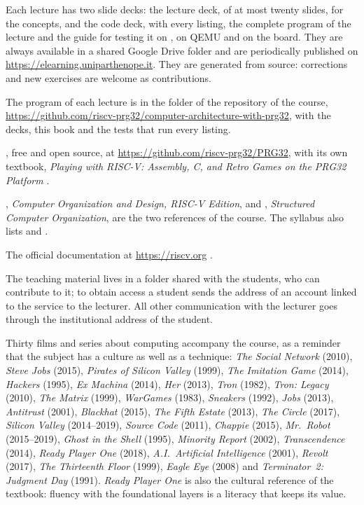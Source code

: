\begin{description}[style=nextline,leftmargin=1.5em]
\item[Slides.] Each lecture has two slide decks: the lecture deck, of at most
  twenty slides, for the concepts, and the code deck, with every listing, the
  complete program of the lecture and the guide for testing it on \prgqt, on
  QEMU and on the board. They are always available in a shared Google Drive
  folder and are periodically published on
  \url{https://elearning.uniparthenope.it}. They are generated from source:
  corrections and new exercises are welcome as contributions.
\item[Programs.] The program of each lecture is in the folder  of
  the repository of the course,
  \url{https://github.com/riscv-prg32/computer-architecture-with-prg32}, with
  the decks, this book and the tests that run every listing.
\item[Platform.] \prg, free and open source, at
  \url{https://github.com/riscv-prg32/PRG32}, with its own textbook,
  \emph{Playing with RISC-V: Assembly, C, and Retro Games on the PRG32
  Platform} \citep{prg32textbook}.
\item[Textbooks.] \citet{patterson2020}, \emph{Computer Organization and
  Design, RISC-V Edition}, and \citet{tanenbaum2013}, \emph{Structured
  Computer Organization}, are the two references of the course. The syllabus
  also lists \citet{stallings2021} and \citet{bucci2017}.
\item[Standards.] The official \riscv documentation at
  \url{https://riscv.org} \citep{riscvisa}.
\end{description}

The teaching material lives in a folder shared with the students, who can
contribute to it; to obtain access a student sends the address of an account
linked to the service to the lecturer. All other communication with the
lecturer goes through the institutional address of the student.

\begin{prgaside}[Cineforum]
Thirty films and series about computing accompany the course, as a reminder
that the subject has a culture as well as a technique: \emph{The Social
Network} (2010), \emph{Steve Jobs} (2015), \emph{Pirates of Silicon Valley}
(1999), \emph{The Imitation Game} (2014), \emph{Hackers} (1995), \emph{Ex
Machina} (2014), \emph{Her} (2013), \emph{Tron} (1982), \emph{Tron: Legacy}
(2010), \emph{The Matrix} (1999), \emph{WarGames} (1983), \emph{Sneakers}
(1992), \emph{Jobs} (2013), \emph{Antitrust} (2001), \emph{Blackhat} (2015),
\emph{The Fifth Estate} (2013), \emph{The Circle} (2017), \emph{Silicon
Valley} (2014--2019), \emph{Source Code} (2011), \emph{Chappie} (2015),
\emph{Mr.\ Robot} (2015--2019), \emph{Ghost in the Shell} (1995),
\emph{Minority Report} (2002), \emph{Transcendence} (2014), \emph{Ready Player
One} (2018), \emph{A.I.\ Artificial Intelligence} (2001), \emph{Revolt}
(2017), \emph{The Thirteenth Floor} (1999), \emph{Eagle Eye} (2008) and
\emph{Terminator~2: Judgment Day} (1991). \emph{Ready Player One} is also the
cultural reference of the \prg textbook: fluency with the foundational layers
is a literacy that keeps its value.
\end{prgaside}

